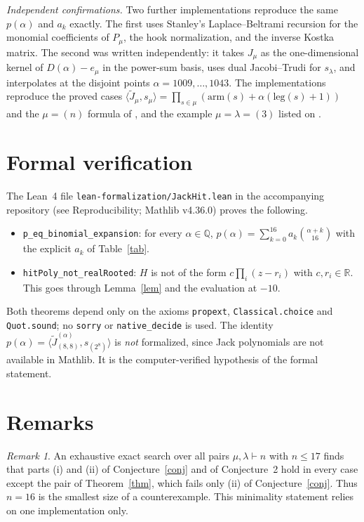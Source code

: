 \documentclass[11pt]{article}
\theoremstyle{remark}
\newtheorem{remark}[theorem]{Remark}
\newcommand{\Jt}{\widetilde{J}}
\begin{document}
\emph{Independent confirmations.} Two further implementations reproduce the same $p(\alpha)$ and $a_k$
exactly. The first uses Stanley's Laplace--Beltrami recursion for the monomial coefficients of $P_\mu$, the hook
normalization, and the inverse Kostka matrix. The second was written independently: it takes
$J_\mu$ as the one-dimensional kernel of $D(\alpha)-e_\mu$ in the power-sum basis, uses dual Jacobi--Trudi for
$s_\lambda$, and interpolates at the disjoint points $\alpha=1009,\dots,1043$. The implementations reproduce the
proved cases $\langle\Jt_\mu,s_\mu\rangle=\prod_{s\in\mu}(\mathrm{arm}(s)+\alpha(\mathrm{leg}(s)+1))$ and the
$\mu=(n)$ formula of \cite{AHW18}, and the example $\mu=\lambda=(3)$ listed on \cite{SymCat}.

\section{Formal verification}

The Lean~4 file \texttt{lean-formalization/JackHit.lean} in the accompanying repository (see Reproducibility; Mathlib v4.36.0) proves the following.
\begin{itemize}
\item \texttt{p\_eq\_binomial\_expansion}: for every $\alpha\in\mathbb Q$,
$p(\alpha)=\sum_{k=0}^{16}a_k\binom{\alpha+k}{16}$ with the explicit $a_k$ of Table~\ref{tab}.
\item \texttt{hitPoly\_not\_realRooted}: $H$ is not of the form $c\prod_i(z-r_i)$ with $c,r_i\in\mathbb R$.
This goes through Lemma~\ref{lem} and the evaluation at $-10$.
\end{itemize}
Both theorems depend only on the axioms \texttt{propext}, \texttt{Classical.choice} and \texttt{Quot.sound}; no
\texttt{sorry} or \texttt{native\_decide} is used. The identity
$p(\alpha)=\langle\Jt_{(8,8)}^{(\alpha)},s_{(2^8)}\rangle$ is \emph{not} formalized, since Jack polynomials are
not available in Mathlib. It is the computer-verified hypothesis of the formal statement.

\section{Remarks}

\begin{remark}
An exhaustive exact search over all pairs $\mu,\lambda\vdash n$ with $n\le 17$ finds that parts (i) and (ii) of
Conjecture~\ref{conj} and of Conjecture~2 hold in every case except the pair of Theorem~\ref{thm}, which fails
only (ii) of Conjecture~\ref{conj}. Thus $n=16$ is the smallest size of a counterexample. This minimality
statement relies on one implementation only.
\end{remark}
\end{document}
